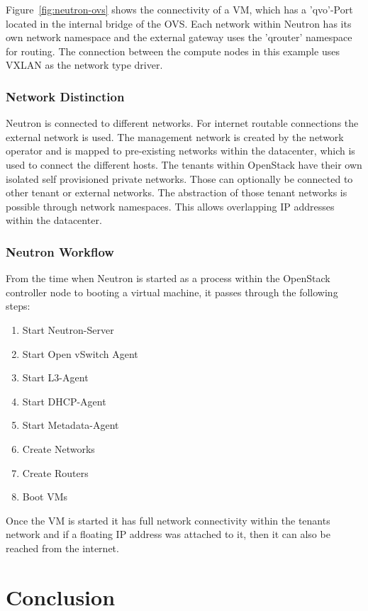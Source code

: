 Figure~\ref{fig:neutron-ovs} shows the connectivity of a VM, which has a 'qvo'-Port located in the internal bridge of the OVS. Each network within Neutron has its own network namespace and the external gateway uses the 'qrouter' namespace for routing. The connection between the compute nodes in this example uses VXLAN as the network type driver.


\subsubsection{Network Distinction}

Neutron is connected to different networks. For internet routable connections the external network is used. The management network is created by the network operator and is mapped to pre-existing networks within the datacenter, which is used to connect the different hosts. The tenants within OpenStack have their own isolated self provisioned private networks. Those can optionally be connected to other tenant or external networks. The abstraction of those tenant networks is possible through network namespaces. This allows overlapping IP addresses within the datacenter.


\subsubsection{Neutron Workflow}

From the time when Neutron is started as a process within the OpenStack controller node to booting a virtual machine, it passes through the following steps:

\begin{enumerate}
\item Start Neutron-Server
\item Start Open vSwitch Agent
\item Start L3-Agent
\item Start DHCP-Agent
\item Start Metadata-Agent
\item Create Networks
\item Create Routers
\item Boot VMs
\end{enumerate}

Once the VM is started it has full network connectivity within the tenants network and if a floating IP address was attached to it, then it can also be reached from the internet.


\section{Conclusion}

